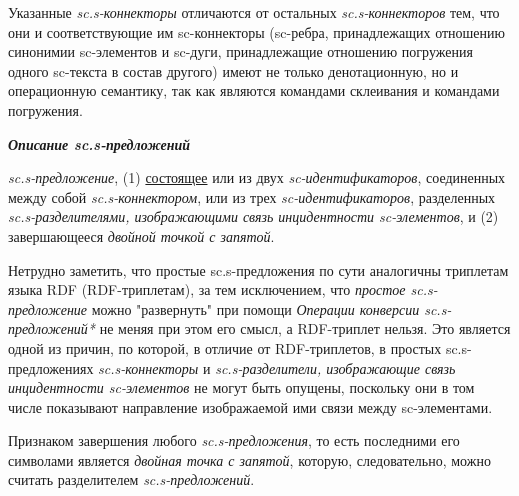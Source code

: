 Указанные \textit{sc.s-коннекторы} отличаются от остальных \textit{sc.s-коннекторов} тем, что они и соответствующие им sc-коннекторы (sc-ребра, принадлежащих отношению синонимии sc-элементов и sc-дуги, принадлежащие отношению погружения одного sc-текста в состав другого) имеют не только денотационную, но и операционную семантику, так как являются командами склеивания и командами погружения.

\bigskip
\textbf{\textit{Описание sc.s-предложений}}

\begin{SCn}
\end{SCn}

\textit{sc.s-предложение}, (1) \uline{состоящее} или из двух \textit{sc-идентификаторов}, соединенных между собой \textit{\mbox{sc.s-коннектором}}, или из трех \textit{sc-идентификаторов}, разделенных \textit{sc.s-разделителями, изображающими связь инцидентности sc-элементов}, и (2) завершающееся \textit{двойной точкой с запятой}.

Нетрудно заметить, что простые sc.s-предложения по сути аналогичны триплетам языка RDF (\mbox{RDF-триплетам}), за тем исключением, что \textit{простое sc.s-предложение} можно "развернуть"{} при помощи \textit{Операции конверсии sc.s-предложений*} не меняя при этом его смысл, а RDF-триплет нельзя. Это является одной из причин, по которой, в отличие от RDF-триплетов, в простых \mbox{sc.s-предложениях} \textit{\mbox{sc.s-коннекторы}} и \textit{\mbox{sc.s-разделители}, изображающие связь инцидентности \mbox{sc-элементов}} не могут быть опущены, поскольку они в том числе показывают направление изображаемой ими связи между sc-элементами.

Признаком завершения любого \textit{sc.s-предложения}, то есть последними его символами является \textit{двойная точка с запятой}, которую, следовательно, можно считать разделителем \textit{sc.s-предложений}.

